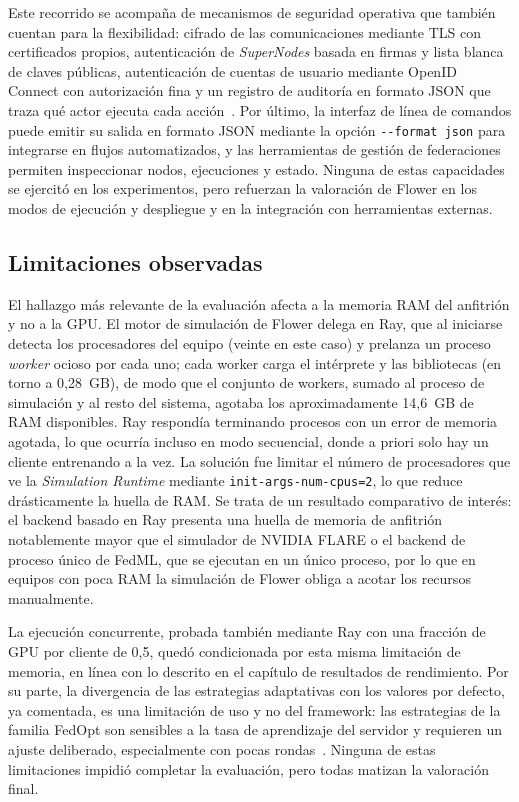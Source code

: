 Este recorrido se acompaña de mecanismos de seguridad operativa que también cuentan
para la flexibilidad: cifrado de las comunicaciones mediante TLS con certificados
propios, autenticación de \textit{SuperNodes} basada en firmas y lista blanca de
claves públicas, autenticación de cuentas de usuario mediante OpenID Connect con
autorización fina y un registro de auditoría en formato JSON que traza qué actor
ejecuta cada acción~\parencite{beutel2020flower}. Por último, la interfaz de línea de
comandos puede emitir su salida en formato JSON mediante la opción
\texttt{-{}-format json} para integrarse en flujos automatizados, y las herramientas de
gestión de federaciones permiten inspeccionar nodos, ejecuciones y estado. Ninguna de
estas capacidades se ejercitó en los experimentos, pero refuerzan la valoración de
Flower en los modos de ejecución y despliegue y en la integración con herramientas
externas.

\subsection{Limitaciones observadas}\label{subsec:flex-flower-lim}

El hallazgo más relevante de la evaluación afecta a la memoria RAM del anfitrión y
no a la GPU. El motor de simulación de Flower delega en Ray, que al iniciarse
detecta los procesadores del equipo (veinte en este caso) y prelanza un proceso
\textit{worker} ocioso por cada uno; cada worker carga el intérprete y las
bibliotecas (en torno a 0,28~GB), de modo que el conjunto de workers, sumado al
proceso de simulación y al resto del sistema, agotaba los aproximadamente 14,6~GB
de RAM disponibles. Ray respondía terminando procesos con un error de memoria
agotada, lo que ocurría incluso en modo secuencial, donde a priori solo hay un
cliente entrenando a la vez. La solución fue limitar el número de procesadores que
ve la \textit{Simulation Runtime} mediante \texttt{init-args-num-cpus=2}, lo que
reduce drásticamente la huella de RAM. Se trata de un resultado comparativo de
interés: el backend basado en Ray presenta una huella de memoria de anfitrión
notablemente mayor que el simulador de NVIDIA FLARE o el backend de proceso único
de FedML, que se ejecutan en un único proceso, por lo que en equipos con poca RAM
la simulación de Flower obliga a acotar los recursos manualmente.

La ejecución concurrente, probada también mediante Ray con una fracción de GPU por
cliente de 0,5, quedó condicionada por esta misma limitación de memoria, en línea
con lo descrito en el capítulo de resultados de rendimiento. Por su parte, la
divergencia de las estrategias adaptativas con los valores por defecto, ya
comentada, es una limitación de uso y no del framework: las estrategias de la
familia FedOpt son sensibles a la tasa de aprendizaje del servidor y requieren un
ajuste deliberado, especialmente con pocas rondas~\parencite{reddi2021adaptive}.
Ninguna de estas limitaciones impidió completar la evaluación, pero todas matizan
la valoración final.

